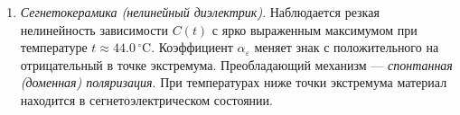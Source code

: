 \begin{enumerate}
    \item \textit{Сегнетокерамика (нелинейный диэлектрик)}.
    Наблюдается резкая нелинейность зависимости $C(t)$ с ярко выраженным максимумом при температуре $t \approx 44.0\,^\circ\text{C}$. Коэффициент $\alpha_\varepsilon$ меняет знак с положительного на отрицательный в точке экстремума.
    Преобладающий механизм --- \textit{спонтанная (доменная) поляризация}.
    При температурах ниже точки экстремума материал находится в сегнетоэлектрическом состоянии.%
\end{enumerate}